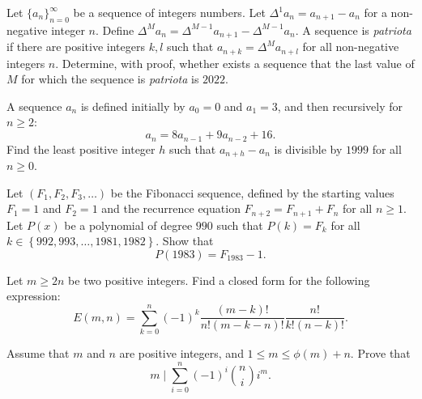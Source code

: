 \begin{question}[name={2022 Brazil}]
    Let $\{a_n\}_{n=0}^{\infty}$ be a sequence of integers numbers. Let $\Delta^1a_n=a_{n+1}-a_n$ for a non-negative integer $n$. Define $\Delta^Ma_n= \Delta^{M-1}a_{n+1}- \Delta^{M-1}a_n$. A sequence is \textit{patriota} if there are positive integers $k,l$ such that $a_{n+k}=\Delta^Ma_{n+l}$ for all non-negative integers $n$. Determine, with proof, whether exists a sequence that the last value of $M$ for which the sequence is \textit{patriota} is $2022$.
\end{question}


\begin{question}[name={1999 Brazil TST}]
    A sequence $a_n$ is defined initially by $a_0=0$ and $a_1=3$, and then recursively for $n\geq 2$: $$a_n=8a_{n-1}+9a_{n-2}+16.$$ Find the least positive integer $h$ such that $a_{n+h}-a_n$ is divisible by $1999$ for all $n\ge0$.
\end{question}


\begin{question}[name={1983 IMO Shortlist}]
    Let $ \left(F_1,F_2,F_3,\dots\right)$ be the Fibonacci sequence, defined by the starting values $ F_1 = 1$ and $ F_2 = 1$ and the recurrence equation $ F_{n + 2} = F_{n + 1} + F_n$ for all $ n\geq 1$. Let $ P\left(x\right)$ be a polynomial of degree $ 990$ such that $ P\left(k\right) = F_k$ for all $ k \in\left\{ 992, 993, \dots , 1981, 1982\right\}$. Show that \[P\left(1983\right) = F_{1983} - 1.\]
\end{question}



\begin{question}[name={2004 Fourth Mathlinks Contest}]
    Let $m \geq 2n$ be two positive integers. Find a closed form for the following expression:
    \[E(m,n)=\sum_{k=0}^{n}(-1)^k\frac{(m-k)!}{n!(m-k-n)!}\frac{n!}{k!(n-k)!}.\]
\end{question}





\begin{question}
    Assume that $m$ and $n$ are positive integers, and $1\leq m\leq \phi (m)+n$. Prove that \[m \mid \sum_{i=0}^{n} (-1)^i \binom{n}{i} i^m.\]
\end{question}

